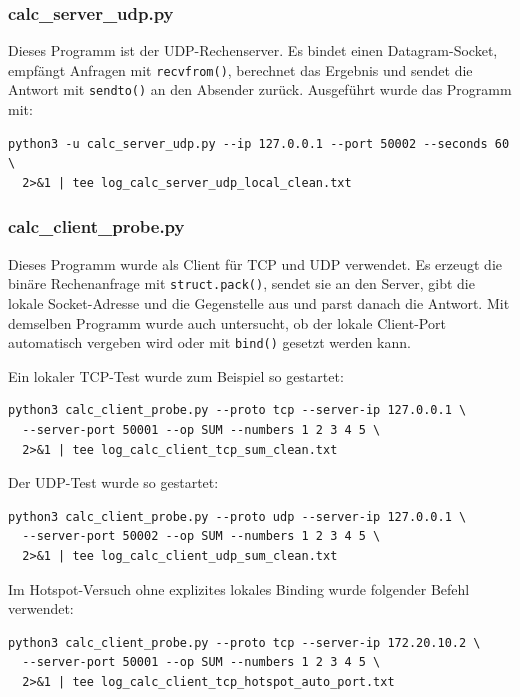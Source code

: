 \documentclass{kdiartcl}
\begin{document}
\subsubsection*{calc\_server\_udp.py}

Dieses Programm ist der UDP-Rechenserver. Es bindet einen Datagram-Socket, empfängt Anfragen mit \texttt{recvfrom()}, berechnet das Ergebnis und sendet die Antwort mit \texttt{sendto()} an den Absender zurück. Ausgeführt wurde das Programm mit:

\begin{verbatim}
python3 -u calc_server_udp.py --ip 127.0.0.1 --port 50002 --seconds 60 \
  2>&1 | tee log_calc_server_udp_local_clean.txt
\end{verbatim}

\subsubsection*{calc\_client\_probe.py}

Dieses Programm wurde als Client für TCP und UDP verwendet. Es erzeugt die binäre Rechenanfrage mit \texttt{struct.pack()}, sendet sie an den Server, gibt die lokale Socket-Adresse und die Gegenstelle aus und parst danach die Antwort. Mit demselben Programm wurde auch untersucht, ob der lokale Client-Port automatisch vergeben wird oder mit \texttt{bind()} gesetzt werden kann.

Ein lokaler TCP-Test wurde zum Beispiel so gestartet:

\begin{verbatim}
python3 calc_client_probe.py --proto tcp --server-ip 127.0.0.1 \
  --server-port 50001 --op SUM --numbers 1 2 3 4 5 \
  2>&1 | tee log_calc_client_tcp_sum_clean.txt
\end{verbatim}

Der UDP-Test wurde so gestartet:

\begin{verbatim}
python3 calc_client_probe.py --proto udp --server-ip 127.0.0.1 \
  --server-port 50002 --op SUM --numbers 1 2 3 4 5 \
  2>&1 | tee log_calc_client_udp_sum_clean.txt
\end{verbatim}

Im Hotspot-Versuch ohne explizites lokales Binding wurde folgender Befehl verwendet:

\begin{verbatim}
python3 calc_client_probe.py --proto tcp --server-ip 172.20.10.2 \
  --server-port 50001 --op SUM --numbers 1 2 3 4 5 \
  2>&1 | tee log_calc_client_tcp_hotspot_auto_port.txt
\end{verbatim}
\end{document}
